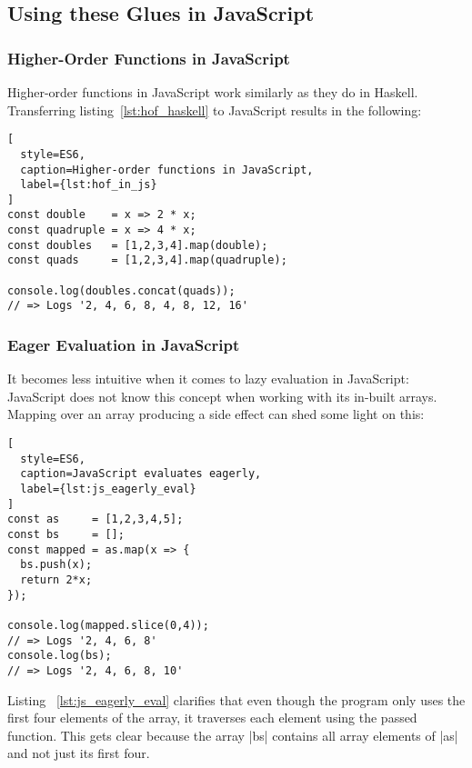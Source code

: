 \subsection{Using these Glues in JavaScript} %
\label{sub:Using these Glues in JavaScript}

\subsubsection{Higher-Order Functions in JavaScript} %
\label{subsub:Higher Order Functions in JavaScript}
Higher-order functions in JavaScript work similarly as they do in Haskell.
Transferring listing~\ref{lst:hof_haskell} to JavaScript results in the
following:

\begin{lstlisting}[
  style=ES6,
  caption=Higher-order functions in JavaScript,
  label={lst:hof_in_js}
]
const double    = x => 2 * x;
const quadruple = x => 4 * x;
const doubles   = [1,2,3,4].map(double);
const quads     = [1,2,3,4].map(quadruple);

console.log(doubles.concat(quads));
// => Logs '2, 4, 6, 8, 4, 8, 12, 16'
\end{lstlisting}

\subsubsection{Eager Evaluation in JavaScript} %
\label{subsub:Eager Evaluation in JavaScript}

It becomes less intuitive when it comes to lazy evaluation in JavaScript:
JavaScript does not know this concept when working with its in-built arrays.
Mapping over an array producing a side effect can shed some light on this:

\begin{lstlisting}[
  style=ES6,
  caption=JavaScript evaluates eagerly,
  label={lst:js_eagerly_eval}
]
const as     = [1,2,3,4,5];
const bs     = [];
const mapped = as.map(x => {
  bs.push(x);
  return 2*x;
});

console.log(mapped.slice(0,4));
// => Logs '2, 4, 6, 8'
console.log(bs);
// => Logs '2, 4, 6, 8, 10'
\end{lstlisting}

Listing ~\ref{lst:js_eagerly_eval} clarifies that even though the program only
uses the first four elements of the array, it traverses each element using the
passed function. This gets clear because the array |bs| contains all array
elements of |as| and not just its first four.

